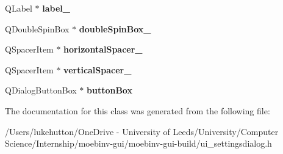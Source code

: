 \begin{DoxyCompactItemize}
Q\+Label $\ast$ {\bfseries label\+\_}
\item 
\mbox{\label{class_ui__settings_dialog_affdd0804285454c334853dd702f0f4c2}} 
Q\+Double\+Spin\+Box $\ast$ {\bfseries double\+Spin\+Box\+\_}
\item 
\mbox{\label{class_ui__settings_dialog_affd52a1b02f018dbeb5261a37f7aa9fb}} 
Q\+Spacer\+Item $\ast$ {\bfseries horizontal\+Spacer\+\_}
\item 
\mbox{\label{class_ui__settings_dialog_a766fad3cfaf98dde8ae45ce9392e250a}} 
Q\+Spacer\+Item $\ast$ {\bfseries vertical\+Spacer\+\_}
\item 
\mbox{\label{class_ui__settings_dialog_a9fd9aea95caaf8c0f62efbb46711d137}} 
Q\+Dialog\+Button\+Box $\ast$ {\bfseries button\+Box}
\end{DoxyCompactItemize}


The documentation for this class was generated from the following file\+:\begin{DoxyCompactItemize}
\item 
/\+Users/lukehutton/\+One\+Drive -\/ University of Leeds/\+University/\+Computer Science/\+Internship/moebinv-\/gui/moebinv-\/gui-\/build/ui\+\_\+settingsdialog.\+h\end{DoxyCompactItemize}
